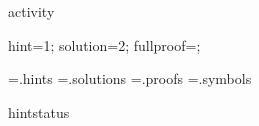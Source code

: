 
\def\proofcase#1{\noi\proofcasestylize{#1}}
\def\proofpart#1{\noi\proofpartstylize{#1}}
\def\crproofcase#1{\eop\proofcase{#1}}
\def\crproofpart#1{\eop\proofpart{#1}}
\def\crtabproofcase#1{\eop\indent\proofcase{#1}}
\def\crtabproofpart#1{\eop\indent\proofpart{#1}}
\def\proofalt#1{\noi\proofaltstylize{#1}}
\def\crproofalt#1{\eop\proofalt{#1}}
\def\crtabproofalt#1{\eop\indent\proofalt{#1}}
\def\mistake{\hfill\mistakesymbol}%




\DefStyle activity     {\rm}

\def\activitysymbol{\raise.4ex\hbox{$\scriptscriptstyle\blacktriangleright$}}
\def\qedsymbol{\vrule width .3em height 1.8ex depth .1ex\relax} %
\def\qecsymbol{\vrule width .3em height 1.8ex depth .1ex\relax} %
\def\qessymbol{\boxit{0pt}{\phantom{\qedsymbol}}} %
\def\qexsymbol{\ensuremath{\bullet}} %
\def\qepsymbol{\ensuremath{\fatsemi}} %
\def\mistakesymbol{\ensuremath{\lightning}}
\def\qedword{{\scshape οεδ}}
\def\qecword{{\scshape οεπ}}
\def\qesword{{\scshape οες}}
\def\qedof#1.{\hfill\qedsymbol~(#1)} %


\Newskip hint=1\baselineskip;
\Newskip solution=2\hintskipamount;
\Newskip fullproof=\solutionskipamount;

\newwrite\hintsfile
\newwrite\solutionsfile
\newwrite\fullproofsfile
\newwrite\symbolsfile
\immediate\openout\hintsfile=\jobname.hints
\immediate\openout\solutionsfile=\jobname.solutions
\immediate\openout\fullproofsfile=\jobname.proofs
\immediate\openout\symbolsfile=\jobname.symbols



\DefStyle hintstatus   {\color{hintstatuscolor}\sixrm}

\def\rhanghintstatus#1{\rlap{\raise.125ex\hbox{\hintstatusstylize{(\thinspace\structtag\thinspace \hinttagdecorator\thinspace#1)}}}}

\def\writesymbol#1#2#3#4{%
\immediate\write\symbolsfile{%
\ea\string\csname symbolentry\endcsname
    {#1}
    {#2}
    {#3}
    {#4}
}%
}

